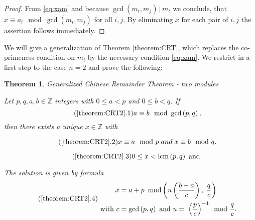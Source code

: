 \documentclass[12pt]{article}
\newtheorem{theorem}{Theorem}
\providecommand{\divides}[2]{#1 \, \lvert \, #2}
\def\lt{<}
\def\Z{\mathbb{Z}}
\DeclareMathOperator*{\modf}{mod}
\DeclareMathOperator{\lcm}{lcm}
\begin{document}
\begin{proof}
	From \eqref{eq:xam} and because $\divides{\gcd\left(m_i, m_j\right)}{m_i}$ we conclude, that $x \equiv a_i \mod \gcd\left(m_i, m_j\right)$ for all $i, j$. By eliminating $x$ for each pair of $i,j$ the assertion follows immediately. 
\end{proof}

We will give a generalization of Theorem \ref{theorem:CRT}, which replaces the co-primeness condition on $ m_i$ by the necessary condition \eqref{eq:xam}. We restrict in a first step to the case $ n = 2$ and prove the following:

\begin{theorem}{Generalized Chinese Remainder Theorem - two modules}
	\label{theorem:CRT2}
	
	Let $ p, q, a, b \in \Z$ integers with $0 \le a \lt p$ and $ 0 \le b \lt q$. If
\begin{equation}
\label{eq:abpq}\tag{\ref{theorem:CRT2}.1}
 a \equiv b \mod \gcd\left(p, q\right),
\end{equation}
then there exists a unique $ x \in \Z $ with 

\begin{equation}
\label{eq:xapbq}\tag{\ref{theorem:CRT2}.2}
x \equiv a \mod p \; and \; x \equiv b \mod q.
\end{equation}

\begin{equation}
\label{eq:xltlcm}\tag{\ref{theorem:CRT2}.3}
 0 \le x \lt \lcm\left(p, q\right) \text{ and }
\end{equation}

The solution is given by formula
\begin{equation}
\label{eq:xab}\tag{\ref{theorem:CRT2}.4}
\begin{split}
x &= a + p \ \modf\left( u \left(\frac{b - a}{c}\right), \; \frac{q}{c} \right)\\
\text{ with } c &= \gcd\left(p, q\right) \text{ and } u = \; {\left(\frac{p}{c}\right)}^{-1} \mod \frac{q}{c}.\notag
\end{split}
\end{equation}

\end{theorem}
\end{document}
